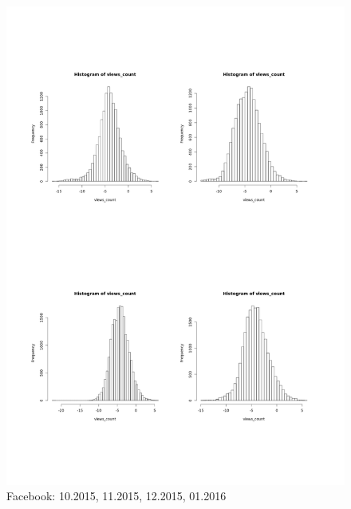 \documentclass{article}
\begin{document}
\begin{figure}[H]
\caption{Facebook: 10.2015, 11.2015, 12.2015, 01.2016}
\centering
\includegraphics[scale=0.7]{facebookGauss}
\end{figure}
\end{document}
